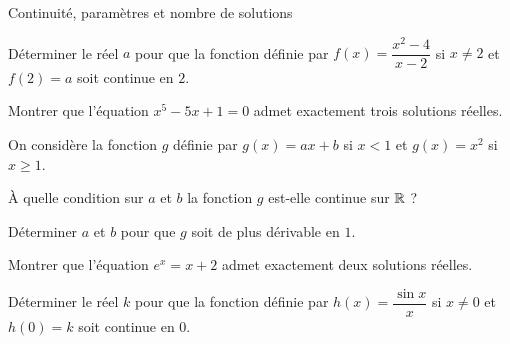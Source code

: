 
\begin{exercice}[3]{Continuité, paramètres et nombre de solutions}
\begin{questions}
  \item Déterminer le réel $a$ pour que la fonction définie par $f(x)=\dfrac{x^{2}-4}{x-2}$ si $x\neq2$ et $f(2)=a$ soit continue en $2$.
  \item Montrer que l'équation $x^{5}-5x+1=0$ admet exactement trois solutions réelles.
  \item On considère la fonction $g$ définie par $g(x)=ax+b$ si $x<1$ et $g(x)=x^{2}$ si $x\geq1$.
    \begin{questions}
      \item À quelle condition sur $a$ et $b$ la fonction $g$ est-elle continue sur $\mathbb{R}$ ?
      \item Déterminer $a$ et $b$ pour que $g$ soit de plus dérivable en $1$.
    \end{questions}
  \item Montrer que l'équation $e^{x}=x+2$ admet exactement deux solutions réelles.
  \item Déterminer le réel $k$ pour que la fonction définie par $h(x)=\dfrac{\sin x}{x}$ si $x\neq0$ et $h(0)=k$ soit continue en $0$.
\end{questions}
\end{exercice}

